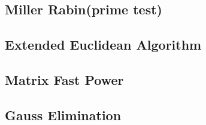 \documentclass[10pt,twocolumn,oneside]{article}
\begin{document}
\subsection{Miller Rabin(prime test)}

\subsection{Extended Euclidean Algorithm}

\subsection{Matrix Fast Power}

\subsection{Gauss Elimination}

\end{document}
